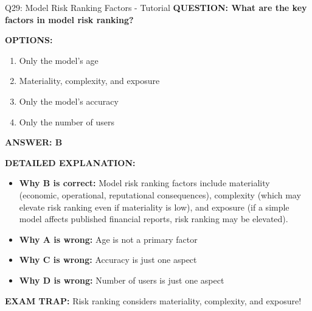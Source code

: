 \documentclass[8pt]{beamer}
\begin{document}
	\begin{frame}{Q29: Model Risk Ranking Factors - Tutorial}
		\fontsize{6.5}{7.5}\selectfont
		\textbf{QUESTION: What are the key factors in model risk ranking?}
		
		\vspace{0.1cm}
		\textbf{OPTIONS:}
		\begin{enumerate}
			\item Only the model's age
			\item Materiality, complexity, and exposure
			\item Only the model's accuracy
			\item Only the number of users
		\end{enumerate}
		
		\vspace{0.1cm}
		\textcolor{myblue}{\textbf{ANSWER: B}}
		
		\vspace{0.1cm}
		\textbf{DETAILED EXPLANATION:}
		\begin{itemize}
			\item \textbf{Why B is correct:} Model risk ranking factors include materiality (economic, operational, reputational consequences), complexity (which may elevate risk ranking even if materiality is low), and exposure (if a simple model affects published financial reports, risk ranking may be elevated).
			\item \textbf{Why A is wrong:} Age is not a primary factor
			\item \textbf{Why C is wrong:} Accuracy is just one aspect
			\item \textbf{Why D is wrong:} Number of users is just one aspect
		\end{itemize}
		
		\textcolor{myred}{\textbf{EXAM TRAP:}} Risk ranking considers \textcolor{myblue}{materiality, complexity, and exposure}!
	\end{frame}
	
\end{document}
